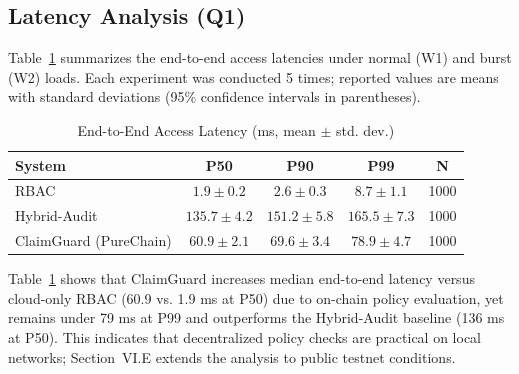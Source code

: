 \documentclass[final,5p,times,twocolumn]{elsarticle}
\begin{document}
\subsection{Latency Analysis (Q1)}
Table~\ref{tab:latency} summarizes the end-to-end access latencies under normal
(W1) and burst (W2) loads. Each experiment was conducted 5 times; reported values are
means with standard deviations (95\% confidence intervals in parentheses).
\begin{table}[!htbp]
	\centering
	\caption{End-to-End Access Latency (ms, mean $\pm$ std. dev.)}
	\begin{tabularx}{\columnwidth}{X c c c c}
		\toprule
		\textbf{System}        & \textbf{P50}    & \textbf{P90}    & \textbf{P99}    & \textbf{N} \\
		\midrule
		RBAC                   & $1.9 \pm 0.2$   & $2.6 \pm 0.3$   & $8.7 \pm 1.1$   & 1000       \\
		Hybrid-Audit           & $135.7 \pm 4.2$ & $151.2 \pm 5.8$ & $165.5 \pm 7.3$ & 1000       \\
		ClaimGuard (PureChain) & $60.9 \pm 2.1$  & $69.6 \pm 3.4$  & $78.9 \pm 4.7$  & 1000       \\
		\bottomrule
	\end{tabularx}
	\label{tab:latency}
\end{table}
Table~\ref{tab:latency} shows that ClaimGuard increases median end-to-end latency versus cloud-only RBAC (60.9 vs.
1.9 ms at P50) due to on-chain policy evaluation, yet remains under 79 ms at P99 and outperforms the Hybrid-Audit baseline (136 ms at P50). This indicates that decentralized policy checks are practical on local networks; Section~VI.E extends the analysis to public testnet conditions.
\end{document}
